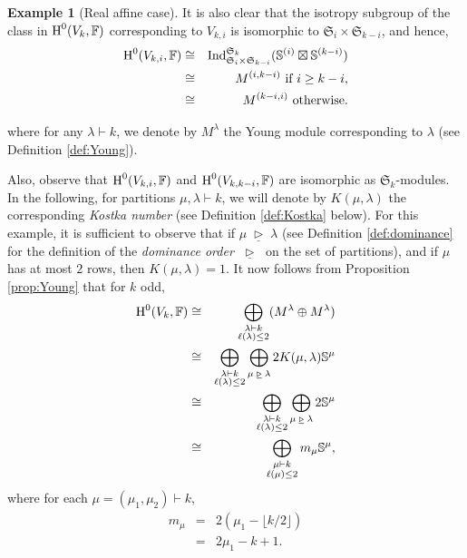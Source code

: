 \documentclass{amsart}
\theoremstyle{definition}
\newtheorem{example}{Example}
\theoremstyle{remark}
\numberwithin{equation}{section}
\begin{document}
\begin{example}[Real affine case]
It is also clear that the isotropy subgroup of 
the class in ${\mbox{\rm H}}^0(V_k,{\mathbb{F}})$ corresponding to $V_{k,i}$
is isomorphic to $\mathfrak{S}_i \times \mathfrak{S}_{k-i}$, and
hence,
\begin{eqnarray*}
{\mbox{\rm H}}^0(V_{k,i},{\mathbb{F}}) &\cong& {\mathrm{Ind}}_{\mathfrak{S}_i \times \mathfrak{S}_{k-i}}^{\mathfrak{S}_k}( \mathbb{S}^{(i)} \boxtimes \mathbb{S}^{(k-i)}) \\
&\cong& M^{(i,k-i)} \mbox{ if }  i \geq k-i,\\
&\cong & M^{(k-i,i)} \mbox{ otherwise}.  
\end{eqnarray*}

where for any $\lambda \vdash k$, we denote by $M^\lambda$ the Young module corresponding to
$\lambda$ (see Definition \ref{def:Young}).

 

Also, observe that ${\mbox{\rm H}}^0(V_{k,i},{\mathbb{F}})$ and ${\mbox{\rm H}}^0(V_{k,k-i},{\mathbb{F}})$ are isomorphic  as $\mathfrak{S}_k$-modules.  
In the following, for partitions $\mu,\lambda \vdash k$, we will denote by $K(\mu,\lambda)$ the corresponding
\emph{Kostka number} (see Definition \ref{def:Kostka} below). For this example, it is sufficient to observe that
if $\mu {{\;\underline{\triangleright}\;}} \lambda$ (see Definition \ref{def:dominance} for the definition of the \emph{dominance order} ${{\;\underline{\triangleright}\;}}$ on the set of
partitions), and if $\mu$ has at most $2$ rows, then $K(\mu,\lambda) = 1$.
It now follows from 
Proposition \ref{prop:Young}
that for $k$ odd,
\begin{eqnarray*}
{\mbox{\rm H}}^0(V_k,{\mathbb{F}}) &\cong & \bigoplus_{\substack{\lambda \vdash k\\ \ell(\lambda) \leq 2}}  (M^\lambda \oplus M^\lambda) \\
& \cong & \bigoplus_{\substack{\lambda \vdash k\\ \ell(\lambda) \leq 2}} \bigoplus_{\mu {{\;\underline{\triangleright}\;}} \lambda} 2 K(\mu,\lambda)  \mathbb{S}^\mu\\
& \cong & \bigoplus_{\substack{\lambda \vdash k\\ \ell(\lambda) \leq 2}} \bigoplus_{\mu {{\;\underline{\triangleright}\;}} \lambda} 2 \mathbb{S}^\mu\\
& \cong & \bigoplus_{\substack{\mu \vdash k\\ \ell(\mu) \leq 2}} m_\mu \mathbb{S}^\mu,
\end{eqnarray*}
where  for each $\mu = (\mu_1,\mu_2)  \vdash k$,   
\begin{eqnarray}
m_\mu &=& 2(\mu_1 - \lfloor k/2 \rfloor)  \nonumber\\
            &=&  2\mu_1 - k +1. \label{eqn:odd}
\end{eqnarray}


\end{example}
\end{document}
